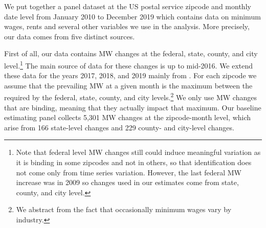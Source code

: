 
We put together a panel dataset at the US postal service zipcode and monthly date level from 
January 2010 to December 2019 which contains data on minimum wages, rents and several other
variables we use in the analysis. More precisely, our data comes from five distinct sources.

First of all, our data contains MW changes at the federal, state, county, and city level.\footnote{
	Note that federal level MW changes still could induce meaningful variation as it is binding in 
	some zipcodes and not in others, so that identification does not come only from time series 
	variation. However, the last federal MW increase was in 2009 so changes used in our estimates 
	come from state, county, and city level.} 
The main source of data for these changes is \textcite{VaghulZipperer2016} up to mid-2016. We 
extend these data for the years 2017, 2018, and 2019 mainly from \textcite{BerkeleyLaborCenter}. 
For each zipcode we assume that the prevailing MW at a given month is the maximum between the 
required by the federal, state, county, and city levels.\footnote{We abstract from the fact that 
	occasionally minimum wages vary by industry.} %
We only use MW changes that are binding, meaning that they actually impact that maximum. Our 
baseline estimating panel collects 5,301 MW changes at the zipcode-month level, which arise 
from 166 state-level changes and 229 county- and city-level changes.

